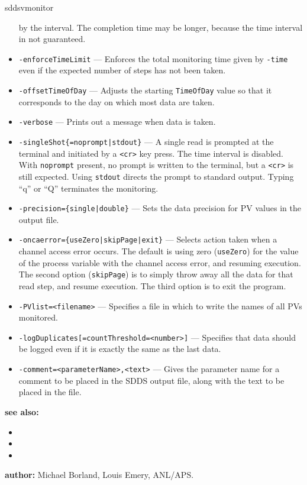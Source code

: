 \begin{sddsprog}{sddsvmonitor}
\begin{itemize}
                by the interval. The completion time may be longer, because the time interval in not guaranteed.
  \item {\tt -enforceTimeLimit} --- Enforces the total monitoring time given by \verb+-time+ even if
                the expected number of steps has not been taken.
  \item {\tt -offsetTimeOfDay} --- Adjusts the starting \verb+TimeOfDay+ value so that it corresponds
                to the day on which most data are taken.
  \item {\tt -verbose} --- Prints out a message when data is taken.
  \item {\verb+-singleShot{=noprompt|stdout}+} --- A single read is prompted at the terminal
                and initiated by a \verb+<cr>+ key press. The time interval is disabled.
                With \verb+noprompt+ present, no prompt is written to the terminal, but a \verb+<cr>+
                is still expected. Using \verb+stdout+ directs the prompt to standard output.
                Typing ``q'' or ``Q'' terminates the monitoring.
  \item {\tt -precision=\{single|double\}} --- Sets the data precision for PV values in the output file.
  \item {\tt -oncaerror=\{useZero|skipPage|exit\}} --- Selects action taken when a channel access error occurs.
                The default is using zero (\verb+useZero+) for the value of the process variable
                with the channel access error, and resuming execution. The second option (\verb+skipPage+) is to
                simply throw away all the data for that read step, and resume execution.
                The third option is to exit the program.
  \item {\tt -PVlist=<filename>} --- Specifies a file in which to write
                the names of all PVs monitored.
  \item {\verb+-logDuplicates[=countThreshold=<number>]+} --- Specifies that data should be
                logged even if it is exactly the same as the last data.
  \item {\verb+-comment=<parameterName>,<text>+} ---
                Gives the parameter name for a comment to be placed in the SDDS output file,
                along with the text to be placed in the file.
\end{itemize}

\item \textbf{see also:}
\begin{itemize}
  \item {}
  \item {}
  \item {}
\end{itemize}
\item \textbf{author:} Michael Borland, Louis Emery, ANL/APS.
\end{sddsprog}
